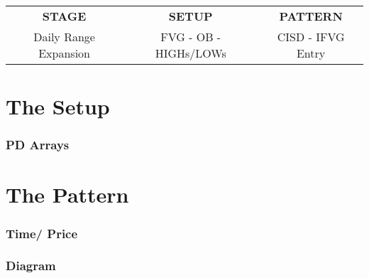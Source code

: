 \documentclass{article}
\begin{document}
\begin{table}[h!]
\centering
\renewcommand{\arraystretch}{2}
\setlength{\tabcolsep}{30pt}
\begin{tabular}{|c|c|c|}
  \hline
  \multirow{2}{*}{\textbf{STAGE}} & \multirow{2}{*}{\textbf{SETUP}} & \multirow{2}{*}{\textbf{PATTERN}} \\
   & & \\
  \hline
  Daily Range Expansion & \rule{0pt}{60pt}FVG - OB - HIGHs/LOWs\rule[-60pt]{0pt}{0pt} & CISD - IFVG Entry \- \\
  \hline
\end{tabular}
\end{table}














\section{The Setup}
\subsubsection{PD Arrays}

\section{The Pattern}
\subsubsection{Time/ Price}
\subsubsection{Diagram}
\end{document}
